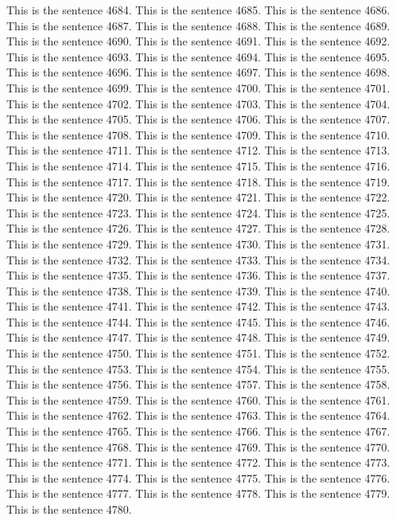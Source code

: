 \documentclass{article}
\begin{document}
This is the sentence 4684.
This is the sentence 4685.
This is the sentence 4686.
This is the sentence 4687.
This is the sentence 4688.
This is the sentence 4689.
This is the sentence 4690.
This is the sentence 4691.
This is the sentence 4692.
This is the sentence 4693.
This is the sentence 4694.
This is the sentence 4695.
This is the sentence 4696.
This is the sentence 4697.
This is the sentence 4698.
This is the sentence 4699.
This is the sentence 4700.
This is the sentence 4701.
This is the sentence 4702.
This is the sentence 4703.
This is the sentence 4704.
This is the sentence 4705.
This is the sentence 4706.
This is the sentence 4707.
This is the sentence 4708.
This is the sentence 4709.
This is the sentence 4710.
This is the sentence 4711.
This is the sentence 4712.
This is the sentence 4713.
This is the sentence 4714.
This is the sentence 4715.
This is the sentence 4716.
This is the sentence 4717.
This is the sentence 4718.
This is the sentence 4719.
This is the sentence 4720.
This is the sentence 4721.
This is the sentence 4722.
This is the sentence 4723.
This is the sentence 4724.
This is the sentence 4725.
This is the sentence 4726.
This is the sentence 4727.
This is the sentence 4728.
This is the sentence 4729.
This is the sentence 4730.
This is the sentence 4731.
This is the sentence 4732.
This is the sentence 4733.
This is the sentence 4734.
This is the sentence 4735.
This is the sentence 4736.
This is the sentence 4737.
This is the sentence 4738.
This is the sentence 4739.
This is the sentence 4740.
This is the sentence 4741.
This is the sentence 4742.
This is the sentence 4743.
This is the sentence 4744.
This is the sentence 4745.
This is the sentence 4746.
This is the sentence 4747.
This is the sentence 4748.
This is the sentence 4749.
This is the sentence 4750.
This is the sentence 4751.
This is the sentence 4752.
This is the sentence 4753.
This is the sentence 4754.
This is the sentence 4755.
This is the sentence 4756.
This is the sentence 4757.
This is the sentence 4758.
This is the sentence 4759.
This is the sentence 4760.
This is the sentence 4761.
This is the sentence 4762.
This is the sentence 4763.
This is the sentence 4764.
This is the sentence 4765.
This is the sentence 4766.
This is the sentence 4767.
This is the sentence 4768.
This is the sentence 4769.
This is the sentence 4770.
This is the sentence 4771.
This is the sentence 4772.
This is the sentence 4773.
This is the sentence 4774.
This is the sentence 4775.
This is the sentence 4776.
This is the sentence 4777.
This is the sentence 4778.
This is the sentence 4779.
This is the sentence 4780.
\end{document}
